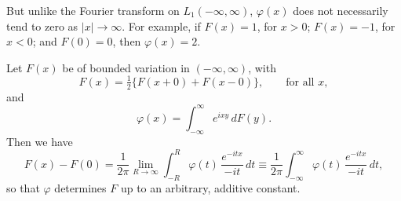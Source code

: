 But unlike the Fourier transform on $L_{1}(-\infty,\infty)$, $\varphi(x)$ does not necessarily tend to zero as $|x|\to\infty$. For example, if $F(x)=1$, for $x>0$; $F(x)=-1$, for $x<0$; and $F(0)=0$, then $\varphi(x)=2$.

\begin{theorem}\label{thm:III-1}
Let $F(x)$ be of bounded variation in $(-\infty,\infty)$, with
\begin{equation}\tag{1.3}\label{eq:III-1.3}
F(x)=\tfrac12\bigl\{F(x+0)+F(x-0)\bigr\},\qquad\text{for all }x,
\end{equation}
and
\begin{equation}\tag{1.4}\label{eq:III-1.4}
\varphi(x)=\int_{-\infty}^{\infty}e^{ixy}\,dF(y).
\end{equation}
Then we have
\begin{equation}\tag{1.5}\label{eq:III-1.5}
F(x)-F(0)=\frac{1}{2\pi}\lim_{R\to\infty}\int_{-R}^{R}\varphi(t)\,\frac{e^{-itx}}{-it}\,dt
\equiv\frac{1}{2\pi}\int_{-\infty}^{\infty}\varphi(t)\,\frac{e^{-itx}}{-it}\,dt,
\end{equation}
so that $\varphi$ determines $F$ up to an arbitrary, additive constant.
\end{theorem}

